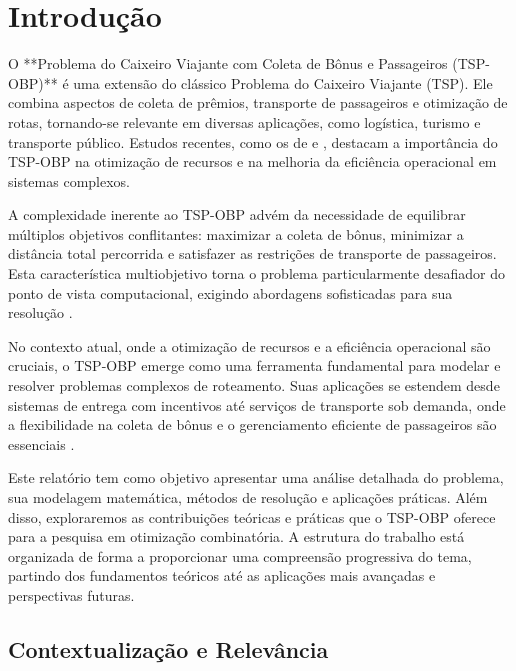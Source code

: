 \documentclass[12pt, a4paper]{report}
\begin{document}

\newpage
\tableofcontents
\thispagestyle{empty}

\newpage
\setcounter{page}{1}
\pagestyle{plain}

\chapter{Introdução}

O **Problema do Caixeiro Viajante com Coleta de Bônus e Passageiros (TSP-OBP)** é uma extensão do clássico Problema do Caixeiro Viajante (TSP). Ele combina aspectos de coleta de prêmios, transporte de passageiros e otimização de rotas, tornando-se relevante em diversas aplicações, como logística, turismo e transporte público. Estudos recentes, como os de \cite{lopesfilho2019} e \cite{carvalho2022}, destacam a importância do TSP-OBP na otimização de recursos e na melhoria da eficiência operacional em sistemas complexos.

A complexidade inerente ao TSP-OBP advém da necessidade de equilibrar múltiplos objetivos conflitantes: maximizar a coleta de bônus, minimizar a distância total percorrida e satisfazer as restrições de transporte de passageiros. Esta característica multiobjetivo torna o problema particularmente desafiador do ponto de vista computacional, exigindo abordagens sofisticadas para sua resolução \cite{gomes2016}.

No contexto atual, onde a otimização de recursos e a eficiência operacional são cruciais, o TSP-OBP emerge como uma ferramenta fundamental para modelar e resolver problemas complexos de roteamento. Suas aplicações se estendem desde sistemas de entrega com incentivos até serviços de transporte sob demanda, onde a flexibilidade na coleta de bônus e o gerenciamento eficiente de passageiros são essenciais \cite{salvador}.

Este relatório tem como objetivo apresentar uma análise detalhada do problema, sua modelagem matemática, métodos de resolução e aplicações práticas. Além disso, exploraremos as contribuições teóricas e práticas que o TSP-OBP oferece para a pesquisa em otimização combinatória. A estrutura do trabalho está organizada de forma a proporcionar uma compreensão progressiva do tema, partindo dos fundamentos teóricos até as aplicações mais avançadas e perspectivas futuras.

\section{Contextualização e Relevância}
\end{document}
